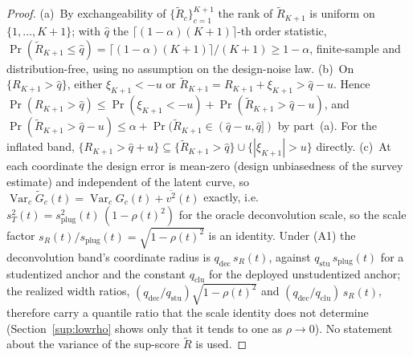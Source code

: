 \documentclass[12pt]{article}
\theoremstyle{definition}
\theoremstyle{remark}
\newcommand{\Gtilde}{\widetilde{G}}
\begin{document}
\begin{proof}
(a)~By exchangeability of $\{\widetilde R_c\}_{c=1}^{K+1}$ the rank of
$\widetilde R_{K+1}$ is uniform on $\{1,\dots,K{+}1\}$; with $\widehat q$ the
$\lceil(1-\alpha)(K{+}1)\rceil$-th order statistic,
$\Pr(\widetilde R_{K+1}\le\widehat q)=\lceil(1-\alpha)(K{+}1)\rceil/(K{+}1)\ge1-\alpha$,
finite-sample and distribution-free, using no assumption on the design-noise law.
(b)~On $\{R_{K+1}>\widehat q\}$, either $\xi_{K+1}<-u$ or
$\widetilde R_{K+1}=R_{K+1}+\xi_{K+1}>\widehat q-u$. Hence
$\Pr(R_{K+1}>\widehat q)\le\Pr(\xi_{K+1}<-u)+\Pr(\widetilde R_{K+1}>\widehat q-u)$, and
$\Pr(\widetilde R_{K+1}>\widehat q-u)\le\alpha+\Pr(\widetilde R_{K+1}\in(\widehat q-u,
\widehat q])$ by part~(a). For the inflated band,
$\{R_{K+1}>\widehat q+u\}\subseteq\{\widetilde R_{K+1}>\widehat q\}\cup\{|\xi_{K+1}|>u\}$
directly. (c)~At each coordinate the design error is mean-zero (design
unbiasedness of the survey estimate) and independent of the latent curve, so
$\operatorname{Var}_c\Gtilde_c(t)=\operatorname{Var}_cG_c(t)+\overline{v^2}(t)$
exactly, i.e.\ $s_T^2(t)=s_{\text{plug}}^2(t)\,(1-\rho(t)^2)$ for the oracle
deconvolution scale, so the scale factor $s_R(t)/s_{\text{plug}}(t)
=\sqrt{1-\rho(t)^2}$ is an identity. Under (A1) the deconvolution band's
coordinate radius is $q_{\text{dec}}\,s_R(t)$, against
$q_{\text{stu}}\,s_{\text{plug}}(t)$ for a studentized anchor and the constant
$q_{\text{clu}}$ for the deployed unstudentized anchor; the realized width
ratios, $(q_{\text{dec}}/q_{\text{stu}})\sqrt{1-\rho(t)^2}$ and
$(q_{\text{dec}}/q_{\text{clu}})\,s_R(t)$, therefore carry a quantile ratio that the scale identity
does not determine (Section~\ref{sup:lowrho} shows only that it tends to one as $\rho\to0$). No
statement about the variance of the sup-score $\widetilde R$ is used.
\end{proof}
\end{document}
